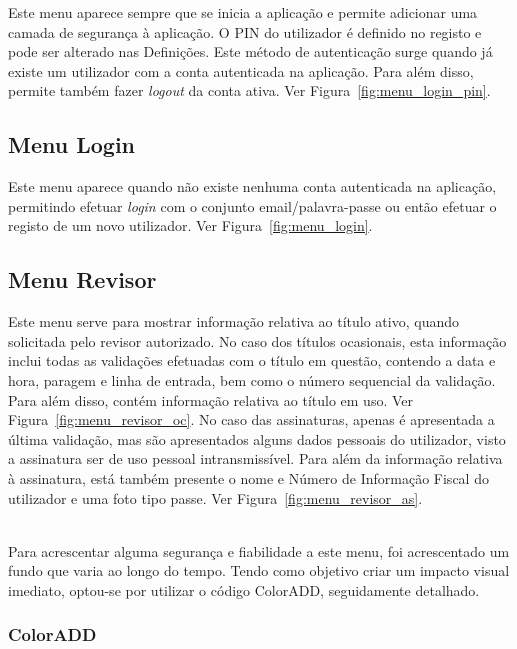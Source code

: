 Este menu aparece sempre que se inicia a aplicação e permite adicionar uma camada de segurança à aplicação. O PIN do utilizador é definido no registo e pode ser alterado nas Definições. Este método de autenticação surge quando já existe um utilizador com a conta autenticada na aplicação. Para além disso, permite também fazer \emph{logout} da conta ativa. Ver Figura~\ref{fig:menu_login_pin}.

\subsection{Menu Login}

Este menu aparece quando não existe nenhuma conta autenticada na aplicação, permitindo efetuar \emph{login} com o conjunto email/palavra-passe ou então efetuar o registo de um novo utilizador. Ver Figura~\ref{fig:menu_login}.

\subsection{Menu Revisor}

Este menu serve para mostrar informação relativa ao título ativo, quando solicitada pelo revisor autorizado. No caso dos títulos ocasionais, esta informação inclui todas as validações efetuadas com o título em questão, contendo a data e hora, paragem e linha de entrada, bem como o número sequencial da validação. Para além disso, contém informação relativa ao título em uso. Ver Figura~\ref{fig:menu_revisor_oc}. No caso das assinaturas, apenas é apresentada a última validação, mas são apresentados alguns dados pessoais do utilizador, visto a assinatura ser de uso pessoal intransmissível. Para além da informação relativa à assinatura, está também presente o nome e Número de Informação Fiscal do utilizador e uma foto tipo passe. Ver Figura~\ref{fig:menu_revisor_as}.

~\\Para acrescentar alguma segurança e fiabilidade a este menu, foi acrescentado um fundo que varia ao longo do tempo. Tendo como objetivo criar um impacto visual imediato, optou-se por utilizar o código ColorADD, seguidamente detalhado.

\subsubsection{ColorADD}


